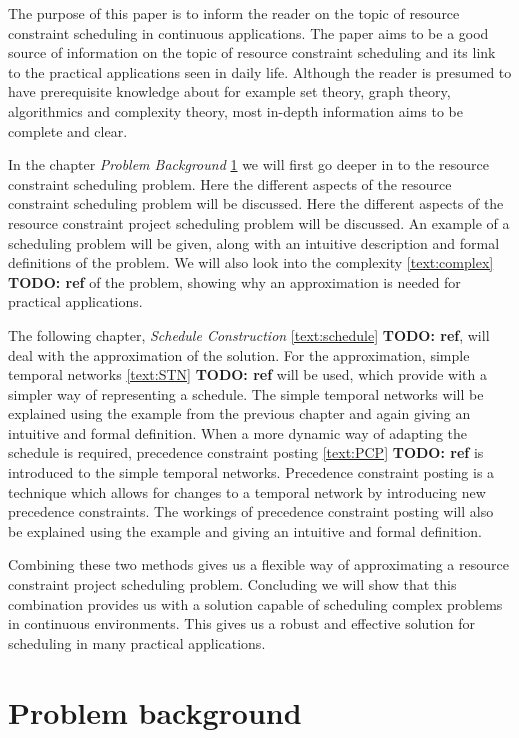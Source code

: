 \documentclass{article}
\theoremstyle{definition}
\newcommand{\TODO}[1]{{\color{red}\textbf{TODO: #1}}}
\begin{document}
The purpose of this paper is to inform the reader on the topic of resource constraint scheduling in continuous applications.
The paper aims to be a good source of information on the topic of resource constraint scheduling and its link to the practical applications seen in daily life.
Although the reader is presumed to have prerequisite knowledge about for example set theory, graph theory, algorithmics and complexity theory, most in-depth information aims to be complete and clear.

In the chapter \emph{Problem Background} \ref{text:problem_background} we will first go deeper in to the resource constraint scheduling problem.
Here the different aspects of the resource constraint scheduling problem will be discussed.
Here the different aspects of the resource constraint project scheduling problem will be discussed.
An example of a scheduling problem will be given, along with an intuitive description and formal definitions of the problem.
We will also look into the complexity \ref{text:complex} \TODO{ref} of the problem, showing why an approximation is needed for practical applications.

The following chapter, \emph{Schedule Construction} \ref{text:schedule} \TODO{ref}, will deal with the approximation of the solution.
For the approximation, simple temporal networks \ref{text:STN} \TODO{ref} will be used, which provide with a simpler way of representing a schedule.
The simple temporal networks will be explained using the example from the previous chapter and again giving an intuitive and formal definition.
When a more dynamic way of adapting the schedule is required, precedence constraint posting \ref{text:PCP} \TODO{ref} is introduced to the simple temporal networks.
Precedence constraint posting is a technique which allows for changes to a temporal network by introducing new precedence constraints.
The workings of precedence constraint posting will also be explained using the example and giving an intuitive and formal definition.

Combining these two methods gives us a flexible way of approximating a resource constraint project scheduling problem.
Concluding we will show that this combination provides us with a solution capable of scheduling complex problems in continuous environments.
This gives us a robust and effective solution for scheduling in many practical applications.


\newpage


\section{Problem background}
\label{text:problem_background}
\end{document}
